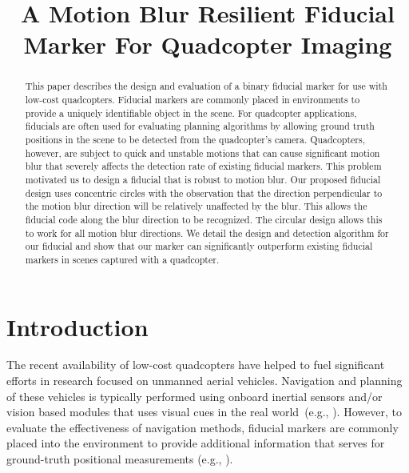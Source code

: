 \documentclass[10pt,twocolumn,letterpaper]{article}
\begin{document}
\title{A Motion Blur Resilient Fiducial Marker For Quadcopter Imaging}
\maketitle

\begin{abstract}
This paper describes the design and evaluation of a binary fiducial marker
for use with low-cost quadcopters.  Fiducial markers are commonly placed
in environments to provide a uniquely identifiable object in the scene.
For quadcopter applications, fiducials are often used for evaluating planning
algorithms by allowing ground truth positions in the scene to be detected from
the quadcopter's camera. Quadcopters, however, are subject to quick and
unstable motions that can cause significant motion blur that severely affects
the detection rate of existing fiducial markers. This problem motivated us to
design a fiducial that is robust to motion blur. Our proposed fiducial design
uses concentric circles with the observation that the direction perpendicular
to the motion blur direction will be relatively unaffected by the blur. This
allows the fiducial code along the blur direction to be recognized.
The circular design allows this to work for all motion blur directions. We
detail the design and detection algorithm for our fiducial and show that our
marker can significantly outperform existing fiducial markers in scenes
captured with a quadcopter.
\end{abstract}

\section{Introduction}

The recent availability of low-cost quadcopters have helped to fuel significant
efforts in research focused on unmanned aerial vehicles. Navigation and planning of
these vehicles is typically performed using onboard inertial sensors and/or
vision based modules that uses visual cues in the real world~(e.g.,
\cite{Davison:2007,Engel12,Engel13}). However, to evaluate the effectiveness of
navigation methods, fiducial markers are commonly placed into the environment
to provide additional information that serves for ground-truth positional
measurements (e.g., \cite{Bosnak:2012,Lim09,Klopschitz:2007}).
\end{document}
